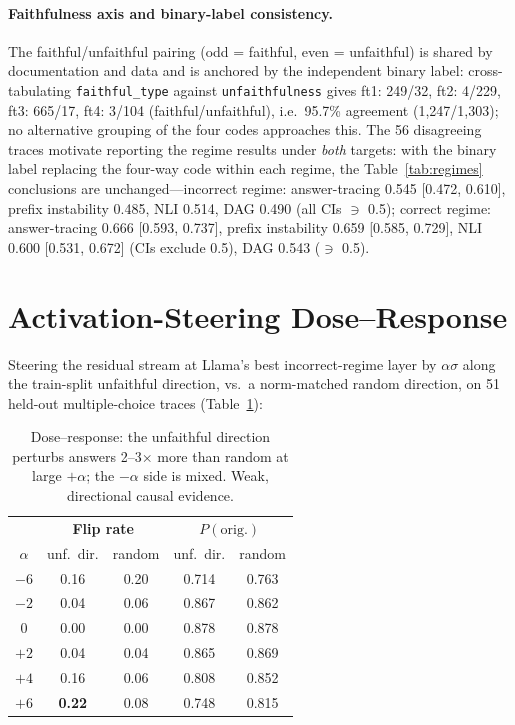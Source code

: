\documentclass[11pt]{article}
\begin{document}
\paragraph{Faithfulness axis and binary-label consistency.} The faithful/unfaithful pairing (odd = faithful, even = unfaithful) is shared by documentation and data and is anchored by the independent binary label: cross-tabulating \texttt{faithful\_type} against \texttt{unfaithfulness} gives ft1: 249/32, ft2: 4/229, ft3: 665/17, ft4: 3/104 (faithful/unfaithful), i.e.\ 95.7\% agreement (1{,}247/1{,}303); no alternative grouping of the four codes approaches this. The 56 disagreeing traces motivate reporting the regime results under \emph{both} targets: with the binary label replacing the four-way code within each regime, the Table~\ref{tab:regimes} conclusions are unchanged---incorrect regime: answer-tracing 0.545 [0.472, 0.610], prefix instability 0.485, NLI 0.514, DAG 0.490 (all CIs $\ni$ 0.5); correct regime: answer-tracing 0.666 [0.593, 0.737], prefix instability 0.659 [0.585, 0.729], NLI 0.600 [0.531, 0.672] (CIs exclude 0.5), DAG 0.543 ($\ni$ 0.5).

\section{Activation-Steering Dose--Response}
\label{app:steering}
Steering the residual stream at Llama's best incorrect-regime layer by $\alpha\sigma$ along the train-split unfaithful direction, vs.\ a norm-matched random direction, on 51 held-out multiple-choice traces (Table~\ref{tab:steering}):

\begin{table}[h]
\centering
\small
\begin{tabular}{@{}ccccc@{}}
\toprule
 & \multicolumn{2}{c}{\textbf{Flip rate}} & \multicolumn{2}{c}{\textbf{$P(\text{orig.})$}} \\
$\alpha$ & unf.\ dir. & random & unf.\ dir. & random \\
\midrule
$-6$ & 0.16 & 0.20 & 0.714 & 0.763 \\
$-2$ & 0.04 & 0.06 & 0.867 & 0.862 \\
$0$  & 0.00 & 0.00 & 0.878 & 0.878 \\
$+2$ & 0.04 & 0.04 & 0.865 & 0.869 \\
$+4$ & 0.16 & 0.06 & 0.808 & 0.852 \\
$+6$ & \textbf{0.22} & 0.08 & 0.748 & 0.815 \\
\bottomrule
\end{tabular}
\caption{Dose--response: the unfaithful direction perturbs answers 2--3$\times$ more than random at large $+\alpha$; the $-\alpha$ side is mixed. Weak, directional causal evidence.}
\label{tab:steering}
\end{table}
\end{document}

